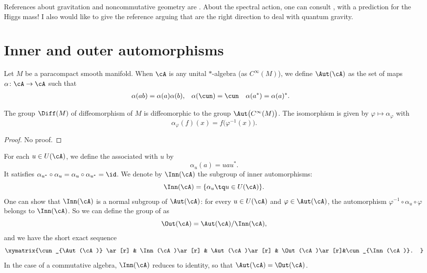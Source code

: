
References about gravitation and noncommutative geometry are \cite{ConnesMotives,Landi,ConnesNCG,itoNCG_Varilly}. About the spectral action, one can consult \cite{SpectralActPrinciple}, with a prediction for the Higgs mass! I also would like to give the reference \cite{MrTopos} arguing that  are the right direction to deal with quantum gravity.

\section{Inner and outer automorphisms}

Let $M$ be a paracompact smooth manifold. When $\cA$ is any unital $*$-algebra (as $ C^{\infty}(M)$), we define $\Aut(\cA)$ as the set of maps $\alpha\colon \cA\to \cA$ such that
\begin{align}
\alpha(ab)&=\alpha(a)\alpha(b),
&\alpha(\cun)&=\cun
 & \alpha(a^*)&=\alpha(a)^*.
\end{align}

\begin{proposition}
The group $\Diff(M)$ of diffeomorphism of $M$ is diffeomorphic to the group $\Aut\big(  C^{\infty}(M) \big)$. The isomorphism is given by $\varphi\mapsto\alpha_{\varphi}$ with
\[
  \alpha_{\varphi}(f)(x)=f\big( \varphi^{-1}(x) \big).
\]
\end{proposition}
\begin{proof}
No proof.
\end{proof}

For each $u\in U(\cA)$, we define the  associated with $u$ by
\begin{equation}
\alpha_u(a)=uau^*.
\end{equation}
It satisfies $\alpha_{u^*}\circ\alpha_{u}=\alpha_u\circ\alpha_{u^*}=\id$. We denote by $\Inn(\cA)$ the subgroup of inner automorphisms:
\[
  \Inn(\cA)=\{ \alpha_u\tq u\in U(\cA) \}.
\]
One can show that $\Inn(\cA)$ is a normal subgroup of $\Aut(\cA)$: for every $u\in U(\cA)$ and $\varphi\in\Aut(\cA)$, the automorphism $\varphi^{-1}\circ\alpha_u\circ\varphi$ belongs to $\Inn(\cA)$. So we can define the group of  as
\[
  \Out(\cA)=\Aut(\cA)/\Inn(\cA),
\]
and we have the short exact sequence
\begin{equation}
\xymatrix{%
   \cun_{\Aut(\cA)} \ar[r]	&	\Inn(\cA)\ar[r]	&	\Aut(\cA)\ar[r]	&	\Out(\cA)\ar[r]&\cun_{\Inn(\cA)}.
}
\end{equation}
In the case of a commutative algebra, $\Inn(\cA)$ reduces to identity, so that $\Aut(\cA)=\Out(\cA)$.


